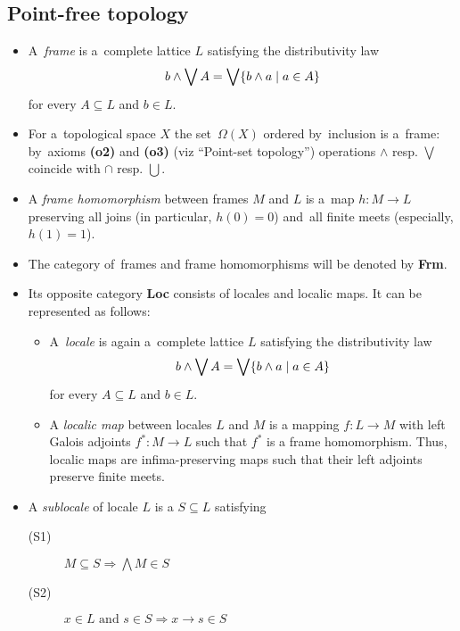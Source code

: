 \subsection*{Point-free topology}

\begin{itemize}
\item A~\emph{frame} is a~complete lattice $L$ satisfying the distributivity
law
\[
  b \wedge \bigvee A = \bigvee \{ b \wedge a \mid a\in A \}
\]
for every $A\subseteq L$ and $b\in L$.

\item For a~topological space $X$ the set~$\Omega(X)$ ordered by~inclusion is
a~frame:
by~axioms {\bf (o2)} and {\bf (o3)} (viz ``Point-set topology'') operations
$\wedge$ resp. $\bigvee$ coincide with $\cap$ resp. $\bigcup$.

\item A \emph{frame homomorphism} between frames $M$ and $L$ is a~map $h\colon
M \to L$ preserving all joins (in particular, $h(0) = 0$) and~all finite meets
(especially, $h(1) = 1$).

\item The category of~frames and frame homomorphisms will be denoted by {\bf
Frm}.

\item Its opposite category {\bf Loc} consists of locales and localic maps.
It can be represented as follows:

  \begin{itemize}
  \item A~\emph{locale} is again a~complete lattice $L$ satisfying the
  distributivity law
  \[
    b \wedge \bigvee A = \bigvee \{ b \wedge a \mid a\in A \}
  \]
  for every $A\subseteq L$ and $b\in L$.

  \item A \emph{localic map} between locales $L$ and $M$ is a mapping $f\colon L
  \to M$ with left Galois adjoints $f^*\colon M \to L$ such that $f^*$ is a frame
  homomorphism.
  Thus, localic maps are infima-preserving maps such that their left adjoints
  preserve finite meets.
  \end{itemize}

\item A \emph{sublocale} of locale $L$ is a $S\subseteq L$ satisfying
  \begin{description}
  \item[(S1)] $M\subseteq S \Longrightarrow \bigwedge M\in S$
  \item[(S2)] $x\in L \text{ and } s\in S \Longrightarrow x \rightarrow s \in S$ 
  \end{description}
\end{itemize}

